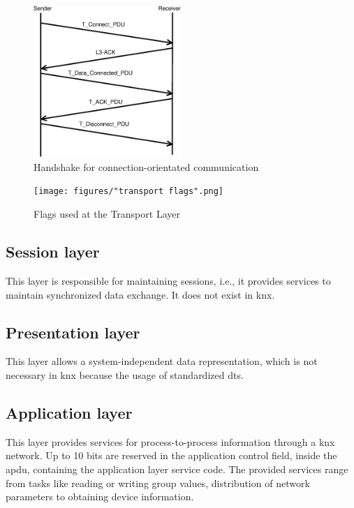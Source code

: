 \begin{figure}
    \centering
    \includegraphics[width=0.5\textwidth]{figures/TransportHandshake.eps}
    \caption{Handshake for connection-orientated communication}
    \label{fig:handshake}
\end{figure}
 
\begin{figure}
    \centering
    \texttt{[image: figures/"transport flags".png]}
    \caption{Flags used at the Transport Layer}
    \label{fig:tFlags}
\end{figure}

\subsection{Session layer}

This layer is responsible for maintaining sessions, i.e., it provides services to maintain synchronized data exchange. It does not exist in \gls{knx}.

\subsection{Presentation layer}

This layer allows a system-independent data representation, which is not necessary in \gls{knx} because the usage of standardized \glspl{dt}.

\subsection{Application layer}

This layer provides services for process-to-process information through a \gls{knx} network. Up to 10 bits are reserved in the application control field,
inside the \gls{apdu}, containing the application layer service code. The provided services range from tasks like reading or writing group values, distribution of network
parameters to obtaining device information.
